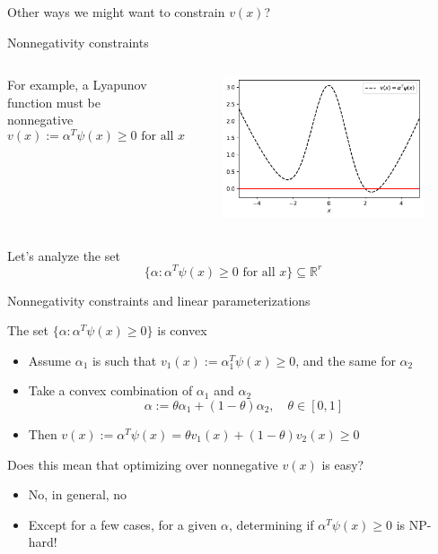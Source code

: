 \documentclass[aspectratio=169]{beamer}
\begin{document}
\begin{frame}{Other ways we might want to constrain $v(x)$?}
\begin{block}{Nonnegativity constraints}
\begin{columns}
For example, a Lyapunov function must be nonnegative
$$
v(x) := \alpha^T \psi(x) \geq 0 \text{ for all } x
$$
\begin{figure}
\includegraphics[width=\columnwidth]{figures/nonnegative.pdf}
\end{figure}
\end{columns}
\end{block}
\pause
Let's analyze the set
$$
\{ \alpha : \alpha^T \psi(x) \geq 0 \text{ for all } x\} \subseteq \mathbb R^r
$$
\end{frame}

\begin{frame}{Nonnegativity constraints and linear parameterizations}
\begin{block}{The set $\{ \alpha : \alpha^T \psi(x) \geq 0\}$ is convex}
\begin{itemize}
\item
Assume $\alpha_1$ is such that $v_1(x) := \alpha_1^T \psi(x) \geq 0$, and the same for $\alpha_2$
\item
Take a convex combination of $\alpha_1$ and $\alpha_2$
$$
\alpha := \theta \alpha_1 + (1 - \theta) \alpha_2, \quad \theta \in [0, 1]
$$
\item
Then $v(x) := \alpha^T \psi(x) = \theta v_1(x)  + (1 - \theta) v_2(x)  \geq 0$
\end{itemize}
\end{block}
\pause
Does this mean that optimizing over nonnegative $v(x)$ is easy?
\begin{itemize}
\item
No, in general, no
\item
Except for a few cases, for a given $\alpha$, determining if $\alpha^T \psi(x) \geq 0$ is NP-hard!
\end{itemize}
\end{frame}
\end{document}
